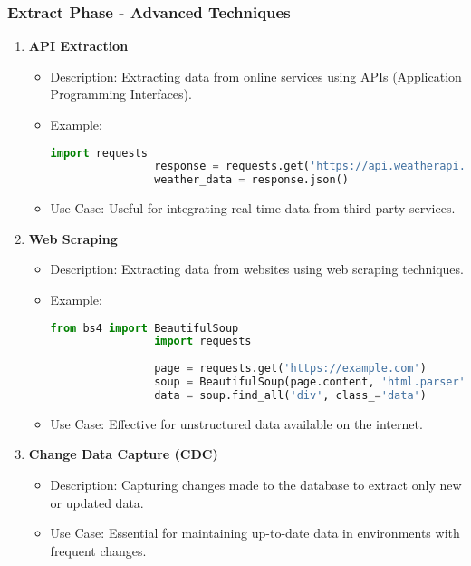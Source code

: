 \documentclass[aspectratio=169]{beamer}
\begin{document}
\begin{frame}[fragile]
    \frametitle{Extract Phase - Advanced Techniques}
    \begin{enumerate}[resume]
        \item \textbf{API Extraction}
            \begin{itemize}
                \item Description: Extracting data from online services using APIs (Application Programming Interfaces).
                \item Example: 
                \begin{lstlisting}[language=Python]
                import requests
                response = requests.get('https://api.weatherapi.com/v1/current.json?key=YOUR_API_KEY&q=London')
                weather_data = response.json()
                \end{lstlisting}
                \item Use Case: Useful for integrating real-time data from third-party services.
            \end{itemize}

        \item \textbf{Web Scraping}
            \begin{itemize}
                \item Description: Extracting data from websites using web scraping techniques.
                \item Example: 
                \begin{lstlisting}[language=Python]
                from bs4 import BeautifulSoup
                import requests
                
                page = requests.get('https://example.com')
                soup = BeautifulSoup(page.content, 'html.parser')
                data = soup.find_all('div', class_='data')
                \end{lstlisting}
                \item Use Case: Effective for unstructured data available on the internet.
            \end{itemize}

        \item \textbf{Change Data Capture (CDC)}
            \begin{itemize}
                \item Description: Capturing changes made to the database to extract only new or updated data.
                \item Use Case: Essential for maintaining up-to-date data in environments with frequent changes.
            \end{itemize}
    \end{enumerate}
\end{frame}
\end{document}
